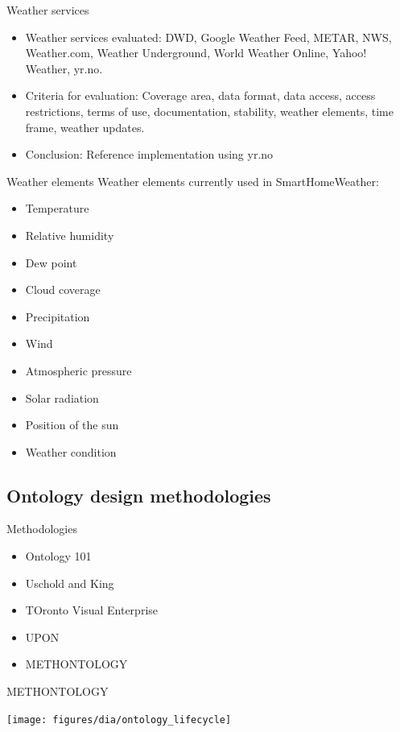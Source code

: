 \documentclass{beamer}
\begin{document}
\begin{frame}{Weather services}
	\begin{itemize}
		\item Weather services evaluated: DWD, Google Weather Feed, METAR, NWS, Weather.com, Weather Underground, World Weather Online, Yahoo! Weather, yr.no.
		\item Criteria for evaluation: Coverage area, data format, data access, access restrictions, terms of use, documentation, stability, weather elements, time frame, weather updates.
		\item Conclusion: Reference implementation using yr.no
	\end{itemize}
\end{frame}

\begin{frame}{Weather elements}
	Weather elements currently used in SmartHomeWeather:
	\begin{itemize}
		\item Temperature
		\item Relative humidity
		\item Dew point
		\item Cloud coverage
		\item Precipitation
		\item Wind
		\item Atmospheric pressure
		\item Solar radiation
		\item Position of the sun
		\item Weather condition
	\end{itemize}
\end{frame}

\subsection{Ontology design methodologies}

\begin{frame}{Methodologies}
	\begin{itemize}
		\item Ontology 101
		\item Uschold and King
		\item TOronto Visual Enterprise
		\item UPON
		\item METHONTOLOGY
	\end{itemize}
\end{frame}

\begin{frame}{METHONTOLOGY}
	\begin{center}
		\texttt{[image: figures/dia/ontology\_lifecycle]}
	\end{center}
\end{frame}
\end{document}
